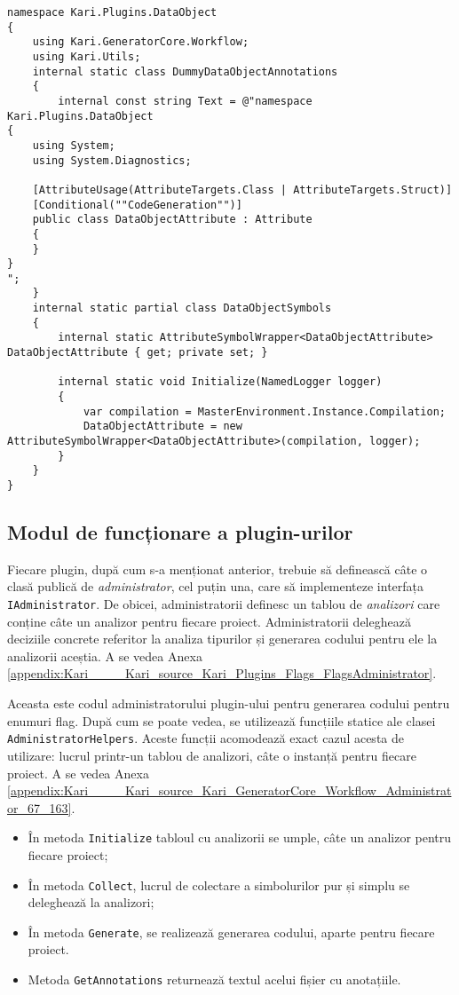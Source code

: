 \documentclass[a4paper,12pt]{report}
\begin{document}
\begin{verbatim}
namespace Kari.Plugins.DataObject
{
    using Kari.GeneratorCore.Workflow;
    using Kari.Utils;
    internal static class DummyDataObjectAnnotations
    {
        internal const string Text = @"namespace Kari.Plugins.DataObject
{
    using System;
    using System.Diagnostics;

    [AttributeUsage(AttributeTargets.Class | AttributeTargets.Struct)]
    [Conditional(""CodeGeneration"")]
    public class DataObjectAttribute : Attribute
    {
    }
}
";
    }
    internal static partial class DataObjectSymbols
    {
        internal static AttributeSymbolWrapper<DataObjectAttribute> DataObjectAttribute { get; private set; }

        internal static void Initialize(NamedLogger logger)
        {
            var compilation = MasterEnvironment.Instance.Compilation;
            DataObjectAttribute = new AttributeSymbolWrapper<DataObjectAttribute>(compilation, logger);
        }
    }
}
\end{verbatim}

\subsection{Modul de funcționare a plugin-urilor}

Fiecare plugin, după cum s-a menționat anterior, trebuie să definească câte o clasă publică de \emph{administrator}, cel puțin una, care să implementeze interfața \texttt{IAdministrator}.
De obicei, administratorii definesc un tablou de \emph{analizori} care conține câte un analizor pentru fiecare proiect.
Administratorii deleghează deciziile concrete referitor la analiza tipurilor și generarea codului pentru ele la analizorii aceștia.
A se vedea Anexa \ref{appendix:Kari____Kari_source_Kari_Plugins_Flags_FlagsAdministrator}.

Aceasta este codul administratorului plugin-ului pentru generarea codului pentru enumuri flag.
După cum se poate vedea, se utilizează funcțiile statice ale clasei \texttt{AdministratorHelpers}.
Aceste funcții acomodează exact cazul acesta de utilizare: lucrul printr-un tablou de analizori, câte o instanță pentru fiecare proiect.
A se vedea Anexa \ref{appendix:Kari____Kari_source_Kari_GeneratorCore_Workflow_Administrator_67_163}.

\begin{itemize}
  \item În metoda \texttt{Initialize\(\)} tabloul cu analizorii se umple, câte un analizor pentru fiecare proiect;
  \item În metoda \texttt{Collect\(\)}, lucrul de colectare a simbolurilor pur și simplu se deleghează la analizori;
  \item În metoda \texttt{Generate\(\)}, se realizează generarea codului, aparte pentru fiecare proiect.
  \item Metoda \texttt{GetAnnotations\(\)} returnează textul acelui fișier cu anotațiile.
\end{itemize}
\end{document}
